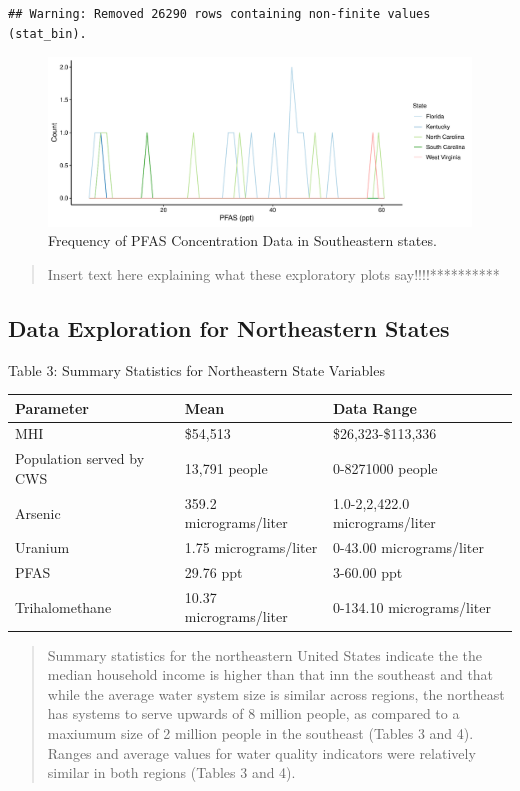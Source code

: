\documentclass[12pt,]{article}
\begin{document}
\begin{verbatim}
## Warning: Removed 26290 rows containing non-finite values (stat_bin).
\end{verbatim}

\begin{figure}
\centering
\includegraphics{Project_Template_files/figure-latex/figs2-1.pdf}
\caption{Frequency of PFAS Concentration Data in Southeastern states.}
\end{figure}

\begin{quote}
Insert text here explaining what these exploratory plots
say!!!!**********
\end{quote}

\newpage

\hypertarget{data-exploration-for-northeastern-states}{%
\subsection{Data Exploration for Northeastern
States}\label{data-exploration-for-northeastern-states}}

Table 3: Summary Statistics for Northeastern State Variables

\begin{longtable}[]{@{}lll@{}}
\toprule
\textbf{Parameter} & \textbf{Mean} & \textbf{Data Range}\tabularnewline
\midrule
\endhead
MHI & \$54,513 & \$26,323-\$113,336\tabularnewline
Population served by CWS & 13,791 people & 0-8271000
people\tabularnewline
Arsenic & 359.2 micrograms/liter & 1.0-2,2,422.0
micrograms/liter\tabularnewline
Uranium & 1.75 micrograms/liter & 0-43.00
micrograms/liter\tabularnewline
PFAS & 29.76 ppt & 3-60.00 ppt\tabularnewline
Trihalomethane & 10.37 micrograms/liter & 0-134.10
micrograms/liter\tabularnewline
\bottomrule
\end{longtable}

\begin{quote}
Summary statistics for the northeastern United States indicate the the
median household income is higher than that inn the southeast and that
while the average water system size is similar across regions, the
northeast has systems to serve upwards of 8 million people, as compared
to a maxiumum size of 2 million people in the southeast (Tables 3 and
4). Ranges and average values for water quality indicators were
relatively similar in both regions (Tables 3 and 4).
\end{quote}
\end{document}
